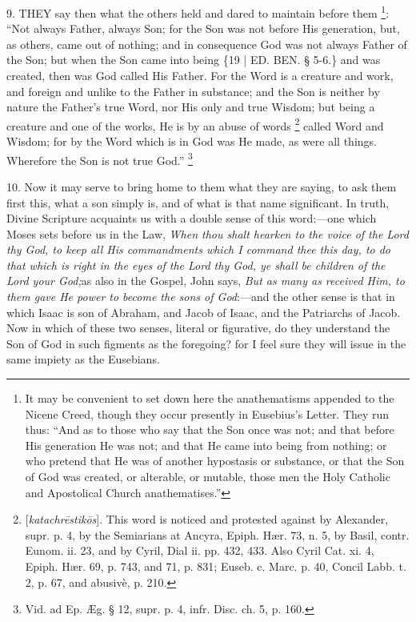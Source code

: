 9. THEY
say then what the others held and dared to maintain before them \footnote{It may be convenient to set down here the anathematisms appended to
the Nicene Creed, though they occur presently in Eusebius's Letter.
They run thus: ``And as to those who say that the Son once was not; and
that before His generation He was not; and that He came into being
from nothing; or who pretend that He was of another hypostasis or
substance, or that the Son of God was created, or alterable, or
mutable, those men the Holy Catholic and Apostolical Church
anathematises.''}: ``Not always Father, always Son; for the Son was not before
His generation, but, as others, came out of nothing; and in
consequence God was not always Father of the Son; but when the Son
came into being \{19 | ED.
BEN.
§ 5-6.\} and was created, then was God called His Father. For the Word
is a creature and work, and foreign and unlike to the Father in
substance; and the Son is neither by nature the Father's true Word,
nor His only and true Wisdom; but being a creature and one of the
works, He is by an abuse of words \footnote{[\emph{katachr\={e}stik\={o}s}]. This word is noticed and
protested against by Alexander, supr. p. 4, by the Semiarians at
Ancyra, Epiph. Hær. 73, n. 5, by Basil, contr. Eunom. ii. 23, and by
Cyril, Dial ii. pp. 432, 433. Also Cyril Cat. xi. 4, Epiph. Hær. 69,
p. 743, and 71, p. 831; Euseb. c. Marc. p. 40, Concil Labb. t. 2, p.
67, and abusivè, p. 210.} called Word and Wisdom; for by the Word which is in God was He
made, as were all things. Wherefore the Son is not true God.'' \footnote{Vid. ad Ep. Æg. § 12, supr. p. 4, infr. Disc. ch. 5, p. 160.}

10. Now it may serve to bring
home to them what they are saying, to ask them first this, what a son
simply is, and of what is that name significant. In truth, Divine
Scripture acquaints us with a double sense of this word:—one which
Moses sets before us in the Law, \emph{When thou shalt hearken to the
voice of the Lord thy God, to keep all His commandments which I
command thee this day, to do that which is right in the eyes of the
Lord thy God, ye shall be children of the Lord your God;}as also
in the Gospel, John says, \emph{But as many as received Him, to them gave
He power to become the sons of God}:—and the other sense is that
in which Isaac is son of Abraham, and Jacob of Isaac, and the
Patriarchs of Jacob. Now in which of these two senses, literal or
figurative, do they understand the Son of God in such figments as the
foregoing? for I feel sure they will issue in the same impiety as the
Eusebians.

